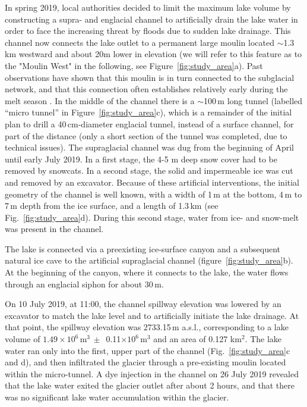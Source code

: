 In spring 2019, local authorities decided to limit the maximum lake volume by constructing a supra- and englacial channel to artificially drain the lake water in order to face the increasing threat by floods due to sudden lake drainage. This channel now connects the lake outlet to a permanent large moulin located $\sim$1.3\,km westward and about 20m lower in elevation (we will refer to this feature as to the "Moulin West" in the following, see Figure~\ref{fig:study_area}a). Past observations have shown that this moulin is in turn connected to the subglacial network, and that this connection often establishes relatively early during the melt season \citep{Finger&al2013}. In the middle of the channel there is a $\sim$100\,m long tunnel (labelled ``micro tunnel'' in Figure~\ref{fig:study_area}c), which is a remainder of the initial plan to drill a 40\,cm-diameter englacial tunnel, instead of a surface channel, for part of the distance (only a short section of the tunnel was completed, due to technical issues). The supraglacial channel was dug from the beginning of April until early July 2019. In a first stage, the 4-5 m deep snow cover had to be removed by snowcats. In a second stage, the solid and impermeable ice was cut and removed by an excavator. Because of these artificial interventions, the initial geometry of the channel is well known, with a width of 1\,m at the bottom, 4\,m to 7\,m depth from the ice surface, and a length of 1.3\,km (see Fig.~\ref{fig:study_area}d). During this second stage, water from ice- and snow-melt was present in the channel.

The lake is connected via a preexisting ice-surface canyon and a subsequent natural ice cave to the artificial supraglacial channel (figure~\ref{fig:study_area}b). At the beginning of the canyon, where it connects to the lake, the water flows through an englacial siphon for about 30\,m.

On 10 July 2019, at 11:00, the channel spillway elevation was lowered by an excavator to match the lake level and to artificially initiate the lake drainage. At that point, the spillway elevation was 2733.15\,m a.s.l., corresponding to a lake volume of $1.49\times10^6$\,m$^3\,\pm\,$ 0.11$\times10^6$\,m$^3$ and an area of 0.127 km$^2$. The lake water ran only into the first, upper part of the channel (Fig.~\ref{fig:study_area}c and d), and then infiltrated the glacier through a pre-existing moulin located within the micro-tunnel. A dye injection in the channel on 26 July 2019 revealed that the lake water exited the glacier outlet after about 2 hours, and that there was no significant lake water accumulation within the glacier.

